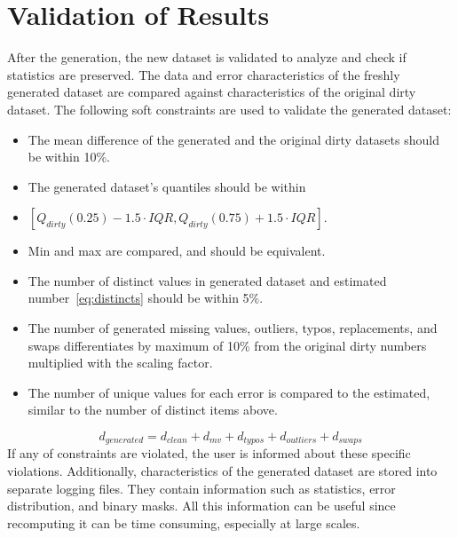 \section{Validation of Results}
\label{sec:validation}
After the generation, the new dataset is validated to analyze and check if statistics are preserved. 
The data and error characteristics of the freshly generated dataset are compared against characteristics of the original dirty dataset.
The following soft constraints are used to validate the generated dataset:
\begin{itemize}
    \item The mean difference of the generated and the original dirty datasets should be within 10\%.
    \item The generated dataset's quantiles should be within 
    \item[~]$[Q_{dirty}(0.25) - 1.5\cdot IQR, Q_{dirty}(0.75) + 1.5\cdot IQR]$.
    \item Min and max are compared, and should be equivalent.
    \item The number of distinct values in generated dataset and estimated number~\ref{eq:distincts} should be within 5\%.
    \item The number of generated missing values, outliers, typos, replacements, and swaps differentiates by maximum  of 10\% from the original dirty numbers multiplied with the scaling factor.
    \item The number of unique values for each error is compared to the estimated, similar to the number of distinct items above.
\end{itemize}

\begin{equation}
\label{eq:distincts}
d_{generated} = d_{clean} + d_{mv} + d_{typos} + d_{outliers} + d_{swaps}
\end{equation}
If any of constraints are violated, the user is informed about these specific violations. 
Additionally, characteristics of the generated dataset are stored into separate logging files. 
They contain information such as statistics, error distribution, and binary masks.
All this information can be useful since recomputing it can be time consuming, especially at large scales.
